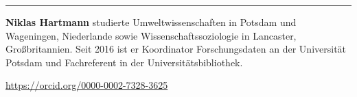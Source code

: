 \begin{center}\rule{0.5\linewidth}{0.5pt}\end{center}

\textbf{Niklas Hartmann} studierte Umweltwissenschaften in Potsdam und
Wageningen, Niederlande sowie Wissenschaftssoziologie in Lancaster,
Großbritannien. Seit 2016 ist er Koordinator Forschungsdaten an der
Universität Potsdam und Fachreferent in der Universitätsbibliothek.

\url{https://orcid.org/0000-0002-7328-3625}
